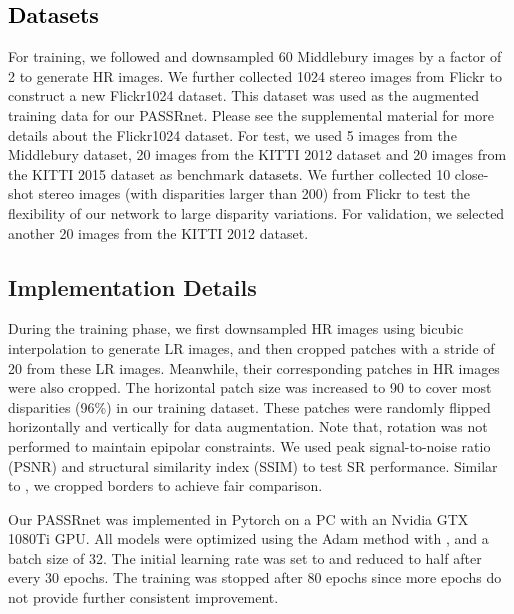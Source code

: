 \documentclass[10pt,twocolumn,letterpaper]{article}
\begin{document}
\subsection{\textcolor{black}{Datasets}}
For training, we followed \cite{2018-EnhancingtheSpatialResolutionofStereoImagesUsingaParallaxPrior-Jeon--} and downsampled 60 Middlebury \cite{2014-HighResolutionStereoDatasetswithSubpixelAccurateGroundTruth-Scharstein-31-42} images by a factor of 2 to generate HR images. We further collected 1024  stereo images from Flickr to construct a new Flickr1024 dataset. This dataset was used as the augmented training data for our PASSRnet. Please see the supplemental material for more details about the Flickr1024 dataset. For test, we used 5 images from the Middlebury dataset, 20 images from the KITTI 2012 dataset \cite{2012-AreWeReadyforAutonomousDriving?theKITTIVisionBenchmarkSuite-Geiger-3354-3361} and 20 images from the KITTI 2015 dataset \cite{2015-ObjectSceneFlowforAutonomousVehicles-Menze-3061-3070} as benchmark \textcolor{black}{datasets}. We further collected 10 close-shot stereo images (with disparities larger than 200) from Flickr to test the flexibility of our network to large disparity variations. For validation, we selected another 20 images from
the KITTI 2012 dataset.

\subsection{Implementation Details}
During the training phase, we first downsampled HR images using bicubic interpolation to generate LR images, and then cropped  patches with a stride of 20 from these LR images. Meanwhile, their corresponding patches in HR images were also cropped. The horizontal patch size was increased to 90 to cover most disparities (96\%) in our training dataset. These patches were randomly flipped horizontally and vertically for data augmentation. Note that, rotation was not performed to maintain epipolar constraints. We used peak signal-to-noise ratio (PSNR) and structural similarity index (SSIM) to test SR performance. Similar to \cite{2018-EnhancingtheSpatialResolutionofStereoImagesUsingaParallaxPrior-Jeon--}, we cropped borders to achieve fair comparison.

Our PASSRnet was implemented in Pytorch on a PC with an Nvidia GTX 1080Ti GPU. All models were optimized using the Adam method \cite{2015-Adam:aMethodforStochasticOptimization-Kingma--} with ,  and a batch size of 32. The initial learning rate was set to  and reduced to half after every 30 epochs. The training was stopped after 80 epochs since more epochs do not provide further consistent improvement.
\end{document}
